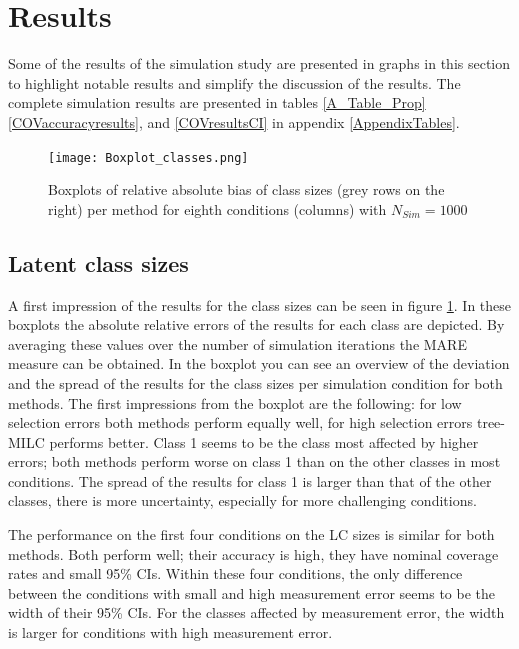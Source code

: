 \documentclass[a4paper, 11pt]{article} %
\begin{document}
\section{Results} \label{ch_results}
Some of the results of the simulation study are presented in graphs in this section to highlight notable results and simplify the discussion of the results. The complete simulation results are presented in tables \ref{A_Table_Prop} \ref{COVaccuracyresults}, and \ref{COVresultsCI} in appendix \ref{AppendixTables}. 

\begin{figure}[h]
    \centering
    \texttt{[image: Boxplot\_classes.png]}
     \caption{Boxplots of relative absolute bias of class sizes (grey rows on the right) per method for eighth conditions (columns) with $N_{Sim} = 1000$}
     \label{fig:boxplotrelbias}
\end{figure}


\subsection{Latent class sizes}
A first impression of the results for the class sizes can be seen in figure \ref{fig:boxplotrelbias}. In these boxplots the absolute relative errors of the results for each class are depicted. By averaging these values over the number of simulation iterations the MARE measure can be obtained. In the boxplot you can see an overview of the deviation and the spread of the results for the class sizes per simulation condition for both methods. The first impressions from the boxplot are the following: for low selection errors both methods perform equally well, for high selection errors tree-MILC performs better. Class 1 seems to be the class most affected by higher errors; both methods perform worse on class 1 than on the other classes in most conditions. The spread of the results for class 1 is larger than that of the other classes, there is more uncertainty, especially for more challenging conditions. 

The performance on the first four conditions on the LC sizes is similar for both methods. Both perform well; their accuracy is high, they have nominal coverage rates and small 95\% CIs. Within these four conditions, the only difference between the conditions with small and high measurement error seems to be the width of their 95\% CIs. For the classes affected by measurement error, the width is larger for conditions with high measurement error. 
\end{document}
